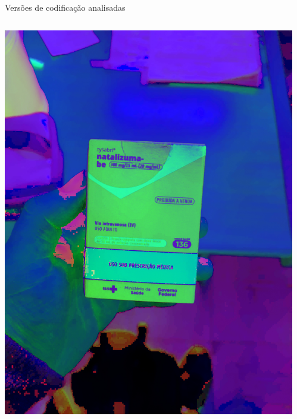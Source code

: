 \begin{frame}{Versões de codificação analisadas}
\begin{columns}
\begin{column}{0.45\textwidth}
\begin{columns}
\begin{column}{0.5\textwidth}
					\includegraphics[height=0.3\textheight]{../pictures/tysabri_HSV.jpg}
				\end{column}
				\begin{column}{0.5\textwidth}\centering

\end{column}
\end{columns}
\end{column}
\end{columns}
\end{frame}
